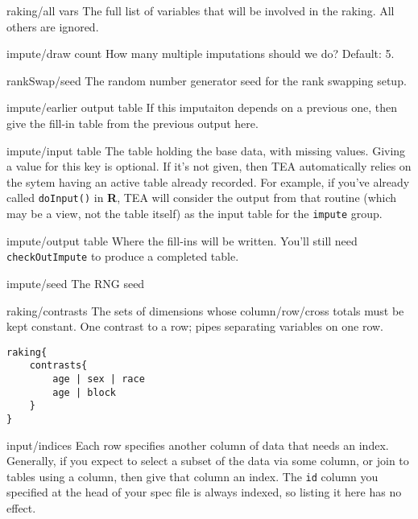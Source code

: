 \begin{key}{raking/all vars}
     The full list of variables that will be involved in the
       raking. All others are ignored. 
\end{key}

\begin{key}{impute/draw count}
   How many multiple imputations should we do? Default: 5.
\end{key}

\begin{key}{rankSwap/seed}
 The random number generator seed for the rank swapping setup.
\end{key}

\begin{key}{impute/earlier output table}
   If this imputaiton depends on a previous one, then give the fill-in table from the previous output here.
 
\end{key}

\begin{key}{impute/input table}
The table holding the base data, with missing values. Giving a value for this key is optional. If it's not given, then TEA automatically relies on the sytem having an active table already recorded. For example, if you've already called {\tt doInput()} in \textbf{R}, TEA will consider the output from that routine (which may be a view, not the table itself) as the input table for the {\tt impute} group.
\end{key}

\begin{key}{impute/output table}
   Where the fill-ins will be written. You'll still need {\tt checkOutImpute} to produce a completed table.
\end{key}

\begin{key}{impute/seed}
   The RNG seed
\end{key}

\begin{key}{raking/contrasts}
 The sets of dimensions whose column/row/cross totals must be kept constant. One contrast to a row; pipes separating variables on one row.
\begin{lstlisting}
raking{
    contrasts{
        age | sex | race
        age | block
    }
}
\end{lstlisting} 
\end{key}

\begin{key}{input/indices}
 Each row specifies another column of data that needs an index. Generally, if you expect to select a subset of the data via some column, or join to tables using a column, then give that column an index. The {\tt id} column you specified at the head of your spec file is always indexed, so listing it here has no effect.
\end{key}

